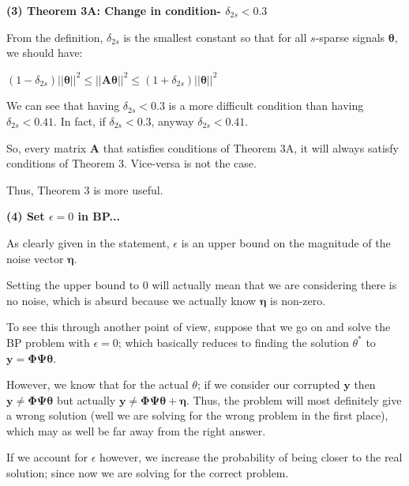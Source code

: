 \documentclass[fleqn, 11pt]{article}
\begin{document}
\bigskip 

\textbf{(3) Theorem 3A: Change in condition- $\delta_{2s} < 0.3$ }

From the definition, $\delta_{2s}$ is the smallest constant so that
for all $s$-sparse signals $\mathbf{\theta}$, we should have:

\begin{center}
    $ (1-\delta_{2s}) ||\mathbf{\theta}||^2 \leq  ||\mathbf{A\theta}||^2 
        \leq  (1+\delta_{2s}) ||\mathbf{\theta}||^2$
\end{center}

We can see that having $\delta_{2s} < 0.3$ is a more difficult condition
than having $\delta_{2s} < 0.41$. In fact, if $\delta_{2s} < 0.3$, 
anyway $\delta_{2s} < 0.41$. 

\smallskip

So, every matrix $\mathbf{A}$ that satisfies conditions of Theorem 3A, 
it will always satisfy conditions of Theorem 3. Vice-versa is 
not the case.

\smallskip

Thus, Theorem 3 is more useful. 



\bigskip 

\textbf{(4) Set $\epsilon=0$ in BP...}

As clearly given in the statement, 
$\epsilon$ is an upper bound on the
magnitude of the noise vector $\mathbf{\eta}$. 

Setting the upper bound to 0 will actually mean that we are considering there is
no noise, which is absurd because we actually know $\mathbf{\eta}$ is non-zero.

\smallskip

To see this through another point of view, suppose that we go on 
and solve the BP problem with $\epsilon=0$; which basically reduces to
finding the solution $\theta^*$ to $\mathbf{y= \Phi \Psi \theta}$. 

\smallskip

However, we know that for the actual $\theta$; if we consider our 
corrupted $\mathbf{y}$ then
$\mathbf{y \neq \Phi \Psi \theta}$ but actually $\mathbf{y \neq \Phi \Psi \theta + \eta} $. Thus, the problem will most definitely 
give a wrong solution (well we are solving for the wrong problem in the first place), which may as well be far away from the right answer.

\smallskip

If we account for $\epsilon$ however, we increase the probability of 
being closer to the real solution; since now we are solving for the
correct problem.
\end{document}
